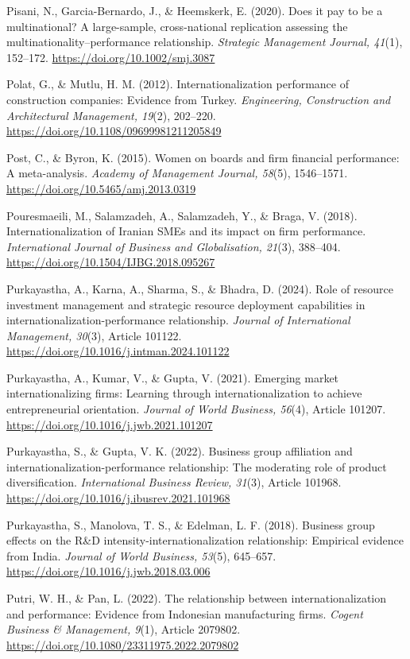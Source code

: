 \documentclass[
  a4paper,
  13pt]{extreport}
\begin{document}
Pisani, N., Garcia-Bernardo, J., \& Heemskerk, E. (2020). Does it pay to
be a multinational? A large-sample, cross-national replication assessing
the multinationality--performance relationship. \emph{Strategic
Management Journal, 41}(1), 152--172.
\url{https://doi.org/10.1002/smj.3087}

Polat, G., \& Mutlu, H. M. (2012). Internationalization performance of
construction companies: Evidence from Turkey. \emph{Engineering,
Construction and Architectural Management, 19}(2), 202--220.
\url{https://doi.org/10.1108/09699981211205849}

Post, C., \& Byron, K. (2015). Women on boards and firm financial
performance: A meta-analysis. \emph{Academy of Management Journal,
58}(5), 1546--1571. \url{https://doi.org/10.5465/amj.2013.0319}

Pouresmaeili, M., Salamzadeh, A., Salamzadeh, Y., \& Braga, V. (2018).
Internationalization of Iranian SMEs and its impact on firm performance.
\emph{International Journal of Business and Globalisation, 21}(3),
388--404. \url{https://doi.org/10.1504/IJBG.2018.095267}

Purkayastha, A., Karna, A., Sharma, S., \& Bhadra, D. (2024). Role of
resource investment management and strategic resource deployment
capabilities in internationalization-performance relationship.
\emph{Journal of International Management, 30}(3), Article 101122.
\url{https://doi.org/10.1016/j.intman.2024.101122}

Purkayastha, A., Kumar, V., \& Gupta, V. (2021). Emerging market
internationalizing firms: Learning through internationalization to
achieve entrepreneurial orientation. \emph{Journal of World Business,
56}(4), Article 101207. \url{https://doi.org/10.1016/j.jwb.2021.101207}

Purkayastha, S., \& Gupta, V. K. (2022). Business group affiliation and
internationalization-performance relationship: The moderating role of
product diversification. \emph{International Business Review, 31}(3),
Article 101968. \url{https://doi.org/10.1016/j.ibusrev.2021.101968}

Purkayastha, S., Manolova, T. S., \& Edelman, L. F. (2018). Business
group effects on the R\&D intensity-internationalization relationship:
Empirical evidence from India. \emph{Journal of World Business, 53}(5),
645--657. \url{https://doi.org/10.1016/j.jwb.2018.03.006}

Putri, W. H., \& Pan, L. (2022). The relationship between
internationalization and performance: Evidence from Indonesian
manufacturing firms. \emph{Cogent Business \& Management, 9}(1), Article
2079802. \url{https://doi.org/10.1080/23311975.2022.2079802}
\end{document}
